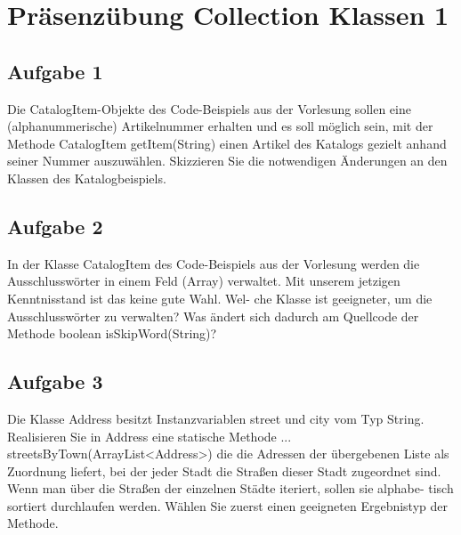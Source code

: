 \chapter{Präsenzübung Collection Klassen 1}

\section{Aufgabe 1}
Die CatalogItem-Objekte des Code-Beispiels aus der Vorlesung sollen eine (alphanummerische)
Artikelnummer erhalten und es soll möglich sein, mit der Methode CatalogItem getItem(String)
einen Artikel des Katalogs gezielt anhand seiner Nummer auszuwählen.
Skizzieren Sie die notwendigen Änderungen an den Klassen des Katalogbeispiels.

\section{Aufgabe 2}
In der Klasse CatalogItem des Code-Beispiels aus der Vorlesung werden die Ausschlusswörter
in einem Feld (Array) verwaltet. Mit unserem jetzigen Kenntnisstand ist das keine gute Wahl. Wel-
che Klasse ist geeigneter, um die Ausschlusswörter zu verwalten? Was ändert sich dadurch am
Quellcode der Methode boolean isSkipWord(String)?

\section{Aufgabe 3}
Die Klasse Address besitzt Instanzvariablen street und city vom Typ String.
Realisieren Sie in Address eine statische Methode
... streetsByTown(ArrayList<Address>)
die die Adressen der übergebenen Liste als Zuordnung liefert, bei der jeder Stadt die Straßen dieser
Stadt zugeordnet sind. Wenn man über die Straßen der einzelnen Städte iteriert, sollen sie alphabe-
tisch sortiert durchlaufen werden.
Wählen Sie zuerst einen geeigneten Ergebnistyp der Methode.

